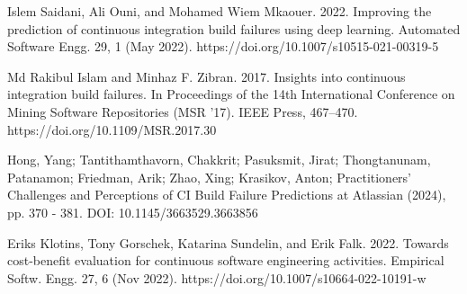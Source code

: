 \begin{thebibliography}{8}
Islem Saidani, Ali Ouni, and Mohamed Wiem Mkaouer. 2022. Improving the prediction of continuous
integration build failures using deep learning. Automated Software Engg. 29, 1 (May 2022).
https://doi.org/10.1007/s10515-021-00319-5

Md Rakibul Islam and Minhaz F. Zibran. 2017. Insights into continuous integration build failures.
In Proceedings of the 14th International Conference on Mining Software Repositories (MSR '17).
IEEE Press, 467–470. https://doi.org/10.1109/MSR.2017.30

Hong, Yang; Tantithamthavorn, Chakkrit; Pasuksmit, Jirat; Thongtanunam, Patanamon; Friedman, Arik;
Zhao, Xing; Krasikov, Anton; Practitioners’ Challenges and Perceptions of CI Build Failure
Predictions at Atlassian (2024), pp. 370 - 381. DOI: 10.1145/3663529.3663856

Eriks Klotins, Tony Gorschek, Katarina Sundelin, and Erik Falk. 2022. Towards cost-benefit
evaluation for continuous software engineering activities. Empirical Softw. Engg. 27, 6 (Nov
2022). https://doi.org/10.1007/s10664-022-10191-w

\end{thebibliography}